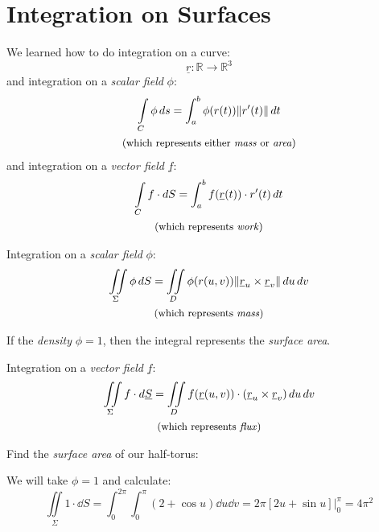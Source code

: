 \documentclass[00_complete]{subfiles}
\begin{document}
\section{Integration on Surfaces}
\begin{reminder}
    We learned how to do integration on a curve:
    $$\underline r: \mathbb{R} \to \mathbb{R}^3$$
    and integration on a \emph{scalar field} $\phi$:
    \begin{gather*}
    \int\limits_C\phi\dd{s}=\int_{a}^{b}\phi(r(t))\|r'(t)\|\dd{t} \\
    \text{\small (which represents either \emph{mass} or \emph{area})}
    \end{gather*}
    and integration on a \emph{vector field} $\underline f$:
    \begin{gather*}
    \int\limits_Cf\cdot \dd{S}=\int_{a}^{b}f(\underline r(t))\cdot r'(t)\dd{t}
    \\
    \text{\small (which represents \emph{work})}
    \end{gather*}
\end{reminder}
Integration on a \emph{scalar field} $\phi$:
\begin{gather*}
\iint\limits_\Sigma \phi \dd{S} = \iint\limits_D \phi(r(u,v))\|\underline
r_u \times \underline r_v\|\dd{u}\dd{v} \\
\text{\small (which represents \emph{mass})}
\end{gather*}
\begin{note}
    If the \emph{density} $\phi=1$, then the integral represents the
    \emph{surface area}.
\end{note}
Integration on a \emph{vector field} $\underline f$:
\begin{gather*}
\iint\limits_\Sigma f \cdot \dd{\underline S} = \iint\limits_D f(\underline
r(u,v))\cdot (\underline r_u \times \underline r_v)\dd{u}\dd{v} \\
\text{\small (which represents \emph{flux})}
\end{gather*}
\begin{example}
    Find the \emph{surface area} of our half-torus:

    We will take $\phi=1$ and calculate:
    $$\iint\limits_\Sigma 1 \cdot \dd{S}=\int_{0}^{2\pi}\int_{0}^{\pi}(2+\cos
    u)\dd{u}\dd{v}=2\pi[2u+\sin u]\Bigr|_0^\pi=4\pi^2$$
\end{example}
\end{document}
